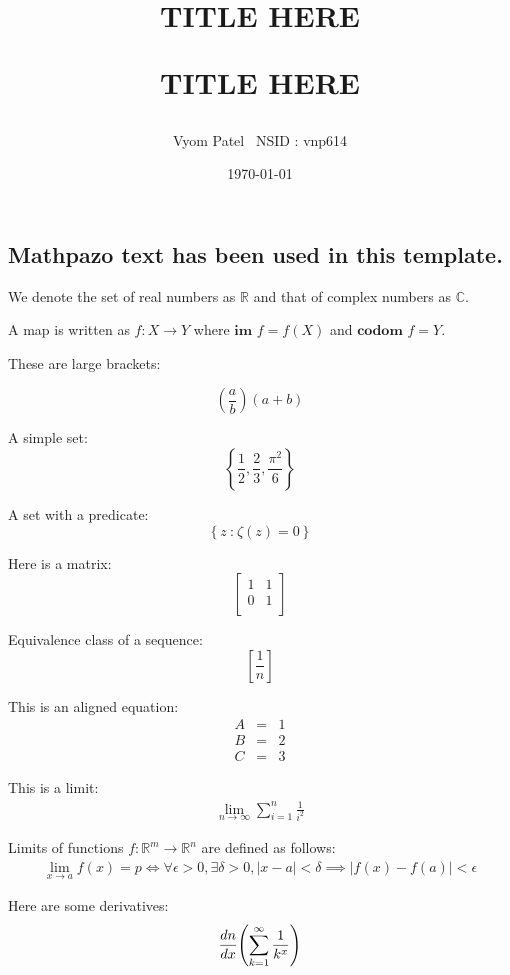 \documentclass[fleqn]{article}
\title{\textbf{TITLE HERE}
	
	TITLE HERE
}
\author{Vyom Patel \ NSID : vnp614}
\date{\today}
\newcommand{\R}{\mathbb{R}}
\newcommand{\C}{\mathbb{C}}
\newcommand{\fn}[3]{#1 : #2 \rightarrow #3}
\newcommand{\br}[1]{\left( #1 \right)}
\newcommand{\curly}[1]{\left\{ #1 \right\}}
\newcommand{\set}[2]{\curly{#1\ \textbf{:}\ #2}}
\newcommand{\im}{\textbf{im }}
\newcommand{\codom}{\textbf{codom }}
\newcommand{\sbr}[1]{\left[ #1 \right]}
\newcommand{\eqn}[1]{\begin{eqnarray*} #1 \end{eqnarray*}}
\newcommand{\abs}[1]{\left| #1 \right|}
\newcommand{\eps}{\epsilon}
\newcommand{\del}{\delta}
\newcommand{\limit}[3]{\lim_{#1 \rightarrow #2}#3}
\newcommand{\bmat}[1]{\ensuremath{\begin{bmatrix} #1 \end{bmatrix}}}
\newcommand{\diff}[3][]{%
	\ifthenelse{\equal{#1}{}}{%
		\ensuremath{\frac{d{#2}}{d{#3}}}%
	}{%
		\ensuremath{\frac{d^{#1}\!{#2}}{d{#3}^{#1}}}%
	}%
}
\begin{document}
\maketitle

\subsection{Mathpazo text has been used in this template.}

We denote the set of real numbers as $\R$ and that of complex numbers as
$\C$.

A map is written as $\fn{f}{X}{Y}$ where $\im f = f(X)$ and $\codom f = Y$.

These are large brackets:

\[
\br{\frac{a}{b}}\br{a + b}
\]

A simple set:
\[
  \curly{\frac{1}{2}, \frac{2}{3}, \frac{\pi^2}{6}}
\]

A set with a predicate:
\[
  \set{z}{\zeta\br{z} = 0}
\]

Here is a matrix:
\[
  \bmat{
    1 & 1 \\
    0 & 1 \\
  }
\]

Equivalence class of a sequence:
\[
  \sbr{\frac{1}{n}}
\]

This is an aligned equation:
\eqn{
  A &=& 1\\
  B &=& 2\\
  C &=& 3
}

This is a limit:
\eqn{
  \limit{n}{\infty}{\sum_{i = 1}^n \frac{1}{i^2}}
}

Limits of functions $\fn{f}{\R^m}{\R^n}$ are defined as follows:
\eqn{
  \limit{x}{a}{f(x)} = p \iff
    \forall \eps > 0, \exists \del > 0, \abs{x - a} < \del
    \implies \abs{f(x) - f(a)} < \eps
}

Here are some derivatives:
\eqn{
  \diff{n}{x}{\br{\sum_{k = 1}^{\infty}\frac{1}{k^x}}}
}
\end{document}
